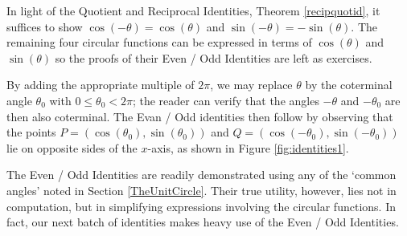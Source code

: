 \smallskip

In light of the Quotient and Reciprocal Identities, Theorem \ref{recipquotid}, it suffices to show $\cos(-\theta) = \cos(\theta)$ and $\sin(-\theta) = -\sin(\theta)$.  The remaining four circular functions can be expressed in terms of $\cos(\theta)$ and $\sin(\theta)$ so the proofs of their Even / Odd Identities are left as exercises.  


By adding the appropriate multiple of $2\pi$, we may replace $\theta$ by the coterminal angle $\theta_0$ with $0\leq\theta_0 <2\pi$; the reader can verify that the angles $-\theta$ and $-\theta_0$ are then also coterminal. The Evan / Odd identities then follow by observing that the points $P=(\cos(\theta_0),\sin(\theta_0))$ and $Q=(\cos(-\theta_0), \sin(-\theta_0))$ lie on opposite sides of the $x$-axis, as shown in Figure \ref{fig:identities1}.

 The Even / Odd Identities are readily demonstrated using any of the `common angles' noted in Section \ref{TheUnitCircle}.  Their true utility, however, lies not in computation, but in simplifying expressions involving the circular functions.  In fact, our next batch of identities makes heavy use of the Even / Odd Identities.

\smallskip


\smallskip

